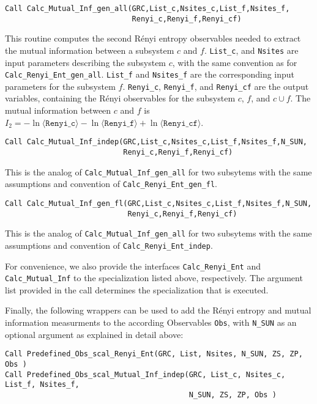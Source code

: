 \begin{lstlisting}[style=fortran]
Call Calc_Mutual_Inf_gen_all(GRC,List_c,Nsites_c,List_f,Nsites_f,
                             Renyi_c,Renyi_f,Renyi_cf)
\end{lstlisting}
This routine computes the second R\'enyi entropy observables needed to extract the mutual information between a subsystem $c$ and $f$. \texttt{List\_c}, and \texttt{Nsites} are input parameters describing the subsystem $c$, with the same convention as for \texttt{Calc\_Renyi\_Ent\_gen\_all}. \texttt{List\_f} and \texttt{Nsites\_f} are the corresponding input parameters for the subsystem $f$. \texttt{Renyi\_c}, \texttt{Renyi\_f}, and \texttt{Renyi\_cf} are the output variables, containing the R\'enyi observables for the subsystem $c$, $f$, and $c\cup f$. The mutual information between $c$ and $f$ is $I_2=-\ln \langle \texttt{Renyi\_c}\rangle -\ln \langle \texttt{Renyi\_f}\rangle +\ln \langle \texttt{Renyi\_cf}\rangle$.

\begin{lstlisting}[style=fortran,breaklines=true]
Call Calc_Mutual_Inf_indep(GRC,List_c,Nsites_c,List_f,Nsites_f,N_SUN,
                           Renyi_c,Renyi_f,Renyi_cf)
\end{lstlisting}
This is the analog of \texttt{Calc\_Mutual\_Inf\_gen\_all} for two subsytems with the same assumptions and convention of \texttt{Calc\_Renyi\_Ent\_gen\_fl}.

\begin{lstlisting}[style=fortran,breaklines=true]
Call Calc_Mutual_Inf_gen_fl(GRC,List_c,Nsites_c,List_f,Nsites_f,N_SUN,
                            Renyi_c,Renyi_f,Renyi_cf)
\end{lstlisting}
This is the analog of \texttt{Calc\_Mutual\_Inf\_gen\_all} for two subsytems with the same assumptions and convention of \texttt{Calc\_Renyi\_Ent\_indep}.

For convenience, we also provide the interfaces \texttt{Calc\_Renyi\_Ent} and \texttt{Calc\_Mutual\_Inf} to the specialization listed above, respectively. The argument list provided in the call determines the specialization that is executed.

Finally, the following wrappers can be used to add the R{\'e}nyi entropy and mutual information measurments to the according Observables \texttt{Obs}, with \texttt{N\_SUN} as an optional argument as explained in detail above:
\begin{lstlisting}[style=fortran,breaklines=true]
Call Predefined_Obs_scal_Renyi_Ent(GRC, List, Nsites, N_SUN, ZS, ZP, Obs )
Call Predefined_Obs_scal_Mutual_Inf_indep(GRC, List_c, Nsites_c, List_f, Nsites_f,
                                          N_SUN, ZS, ZP, Obs )
\end{lstlisting}
